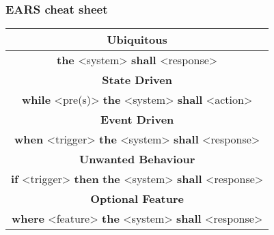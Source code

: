 \documentclass[aspectratio=169]{beamer}
\newcommand{\earsu}[2]{{\bf \color{mypurple}the} {#1} {\bf \color{mypurple}shall} {#2}}
\newcommand{\earse}[3]{{\bf \color{mygreen}when} {#1} {\bf \color{mypurple}the} {#2} {\bf \color{mypurple}shall} {#3}}
\newcommand{\earss}[3]{{\bf \color{mygreen}while} {#1} {\bf \color{mypurple}the} {#2} {\bf \color{mypurple}shall} {#3}}
\newcommand{\earso}[3]{{\bf \color{mygreen}where} {#1} {\bf \color{mypurple}the} {#2} {\bf \color{mypurple}shall} {#3}}
\newcommand{\earsw}[3]{{\bf \color{mygreen}if} {#1} {\bf \color{mygreen}then} {\bf \color{mypurple}the} {#2} {\bf \color{mypurple}shall} {#3}}
\begin{document}
\begin{frame}
  \frametitle{EARS cheat sheet}
  \begin{center}
  \begin{tabular}{|c|}\hline
  {\bf Ubiquitous} \\\hline
  \earsu{<system>}{<response>} \\\hline 
  \textbf{State Driven} \\\hline
  \earss{<pre(s)>}{<system>}{<action>} \\\hline
  \textbf{Event Driven} \\\hline
  \earse{<trigger>}{<system>}{<response>} \\\hline
  \textbf{Unwanted Behaviour} \\\hline
  \earsw{<trigger>}{<system>}{<response>} \\\hline
  \textbf{Optional Feature} \\\hline
  \earso{<feature>}{<system>}{<response>} \\\hline   
  \end{tabular}
  \end{center}
\end{frame}
\end{document}
